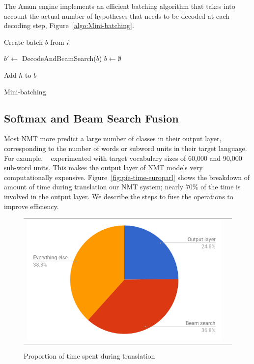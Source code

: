 \documentclass[11pt,a4paper]{article}
\begin{document}
The Amun engine implements an efficient batching algorithm that takes into account the actual number of hypotheses that needs to be decoded at each decoding step, Figure~\ref{algo:Mini-batching}.

\begin{algorithm}
\begin{algorithmic}

\State Create batch $b$ from $i$

  \State $b' \gets$ DecodeAndBeamSearch($b$)
  \State $b \gets \emptyset$
  
      \State Add $h$ to $b$
    \EndIf
  \EndFor
\EndWhile

\EndProcedure

\end{algorithmic}
\caption{Mini-batching}
\label{algo:Mini-batching}
\end{algorithm}


\subsection{Softmax and Beam Search Fusion}

Most NMT more predict a large number of classes in their output layer, corresponding to the number of words or subword units in their target language. For example, ~\citet{sennrich-haddow-birch:2016:P16-12} experimented with target vocabulary sizes of 60,000 and 90,000 sub-word units. This makes the output layer of NMT models very computationally expensive. Figure~\ref{fig:pie-time-europarl} shows the breakdown of amount of time during translation our NMT system; nearly 70\% of the time is involved in the output layer. We describe the steps to fuse the operations to improve efficiency.
\begin{figure}
\centering
\begin{tabular}{cc}
{\includegraphics[scale=0.3]{pie-time.png}} 
\end{tabular}
\caption{Proportion of time spent during translation}
\label{fig:pie-time.png}
\end{figure} 
\end{document}
